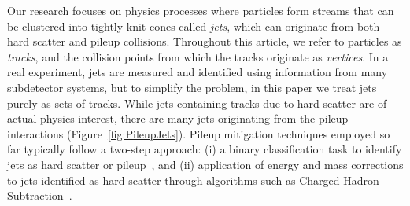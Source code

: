 Our research focuses on physics processes where particles form streams that can be clustered into tightly knit cones called \emph{jets}, which can originate from both hard scatter and pileup collisions. Throughout this article, we refer to particles as \emph{tracks}, and the collision points from which the tracks originate as \emph{vertices}. In a real experiment, jets are measured and identified using information from many subdetector systems, but to simplify the problem, in this paper we treat jets purely as sets of tracks. While jets containing tracks due to hard scatter are of actual physics interest, there are many jets originating from the pileup interactions (Figure~\ref{fig:PileupJets}). Pileup mitigation techniques employed so far typically follow a two-step approach: (i) a binary classification task to identify jets as hard scatter or pileup~\cite{ATLAS-CONF-2014-018}, and (ii) application of energy and mass corrections to jets identified as hard scatter through algorithms such as Charged Hadron Subtraction~\cite{CHS}.




